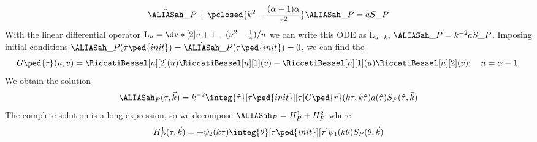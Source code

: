 \begin{draft}
{    \begin{equation}
        \ddot{\ah}\_P + \pclosed{k^2-\frac{(\alpha-1)\alpha}{\tau^2}}\ah\_P = a S\_P
    \end{equation}
    With the linear differential operator $\mathop{\mathrm{L}_{u}}=\dv*[2]{}{u} + 1 - (\nu^2-\frac{1}{4})/u$ we can write this ODE as $\mathop{\mathrm{L}_{u=k\tau}} \ah\_P=  k^{-2}a S\_P$. Imposing initial conditions $\ah\_P(\tau\ped{init})= \dot{\ah}\_P(\tau\ped{init})=0$, we can find the 
    \begin{equation}
        G\ped{r}(u, v)  =\RiccatiBessel[n][2](u) \RiccatiBessel[n][1](v)- \RiccatiBessel[n][1](u) \RiccatiBessel[n][2](v) ; \quad n= \alpha-1.
    \end{equation}
    \citep{kawasakiStudyGravitationalRadiation2011} %
    We obtain the solution
    \begin{equation}
        \ah_P(\tau, \vec{k}) = k^{-2} \integ{\hat{\tau}}[\tau\ped{init}][\tau] G\ped{r}(k\tau, k\hat{\tau}) a (\hat{\tau}) S_P(\hat{\tau}, \vec{k})
    \end{equation}
    The complete solution is a long expression, so we decompose $\ah_P = H^1_P + H^2_P$ where
    \begin{align}
        H_P^1(\tau, \vec{k}) &= +\psi_2(k\tau) \integ{\theta}[\tau\ped{init}][\tau]  \psi_1(k\theta) \Src_P(\theta, \vec{k}) \\

\end{align}}
\end{draft}
